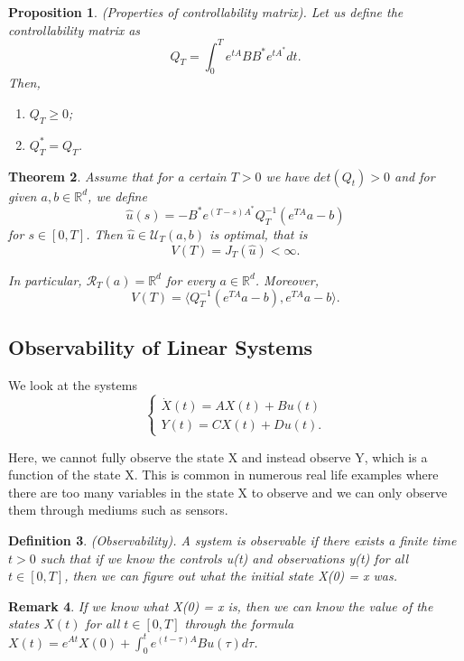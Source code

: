\documentclass[twoside]{article}
\newcounter{lecnum}
\newtheorem{theorem}{Theorem}[lecnum]
\newtheorem{proposition}[theorem]{Proposition}
\newtheorem{remark}[theorem]{Remark}
\newtheorem{definition}[theorem]{Definition}
\begin{document}
\begin{proposition}(Properties of controllability matrix). Let us define the controllability matrix as 
$$
Q_T = \int_0^Te^{tA}BB^*e^{tA^{*}}dt.
$$
Then, 
\begin{enumerate}
\item $Q_T \geq 0$;
\item $Q_T^* = Q_T$.
\end{enumerate}
\end{proposition}

\begin{theorem}Assume that for a certain $T > 0$ we have $det(Q_t) > 0$ and for given $a, b \in \mathbb{R}^d$, we define 
$$
\hat{u}(s) = -B^*e^{(T-s)A^{*}}Q_T^{-1}(e^{TA}a - b)
$$
for $s \in [0,T]$. Then $\hat{u} \in \mathcal{U}_T(a,b)$ is optimal, that is 
$$
V(T) = J_T(\hat{u}) < \infty.
$$

In particular, $\mathcal{R}_T(a) = \mathbb{R}^d$ for every $a \in \mathbb{R}^d$. Moreover, 
$$
V(T) = \langle Q_T^{-1}(e^{TA}a - b), e^{TA}a - b\rangle.
$$
\end{theorem}


\subsection{Observability of Linear Systems}
We look at the systems
$$
\begin{cases}
\dot{X}(t) = AX(t) + Bu(t)\\
Y(t) = CX(t) + Du(t).
\end{cases}
$$

Here, we cannot fully observe the state X and instead observe Y, which is a function of the state X. This is common in numerous real life examples where there are too many variables in the state X to observe and we can only observe them through mediums such as sensors. 

\begin{definition}(Observability). A system is observable if there exists a finite time $t > 0$ such that if we know the controls u(t) and observations y(t) for all $t \in [0, T]$, then we can figure out what the initial state X(0) = x was.
\end{definition}

\begin{remark}If we know what X(0) = x is, then we can know the value of the states $X(t)$ for all $t \in [0,T]$ through the formula $X(t) = e^{At}X(0) + \int_0^te^{(t-\tau)A}Bu(\tau)d\tau$.
\end{remark}
\end{document}
